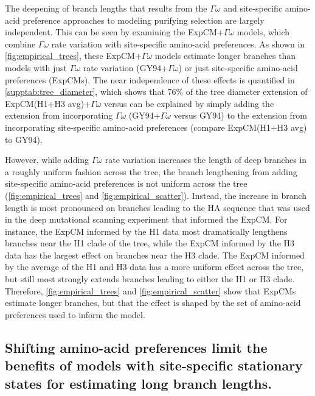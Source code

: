 \documentclass[11pt]{article}
\begin{document}
The deepening of branch lengths that results from the $\Gamma\omega$ and site-specific amino-acid preference approaches to modeling purifying selection are largely independent.
This can be seen by examining the ExpCM+$\Gamma\omega$ models, which combine $\Gamma\omega$ rate variation with site-specific amino-acid preferences.
As shown in \ref{fig:empirical_trees}, these ExpCM+$\Gamma\omega$ models estimate longer branches than models with just $\Gamma\omega$ rate variation (GY94+$\Gamma\omega$) or just site-specific amino-acid preferences (ExpCMs).
The near independence of these effects is quantified in \ref{supptab:tree_diameter}, which shows that 76\% of the tree diameter extension of ExpCM(H1+H3 avg)+$\Gamma\omega$ versus can be explained by simply adding the extension from incorporating $\Gamma\omega$ (GY94+$\Gamma\omega$ versus GY94) to the extension from incorporating site-specific amino-acid preferences (compare ExpCM(H1+H3 avg) to GY94).

However, while adding $\Gamma\omega$ rate variation increases the length of deep branches in a roughly uniform fashion across the tree, the branch lengthening from adding site-specific amino-acid preferences is not uniform across the tree (\ref{fig:empirical_trees} and \ref{fig:empirical_scatter}). 
Instead, the increase in branch length is most pronounced on branches leading to the HA sequence that was used in the deep mutational scanning experiment that informed the ExpCM.
For instance, the ExpCM informed by the H1 data most dramatically lengthens branches near the H1 clade of the tree, while the ExpCM informed by the H3 data has the largest effect on branches near the H3 clade.
The ExpCM informed by the average of the H1 and H3 data has a more uniform effect across the tree, but still most strongly extends branches leading to either the H1 or H3 clade.
Therefore, \ref{fig:empirical_trees} and \ref{fig:empirical_scatter} show that ExpCMs estimate longer branches, but that the effect is shaped by the set of amino-acid preferences used to inform the model.

\subsection*{Shifting amino-acid preferences limit the benefits of models with site-specific stationary states for estimating long branch lengths.}
\end{document}
